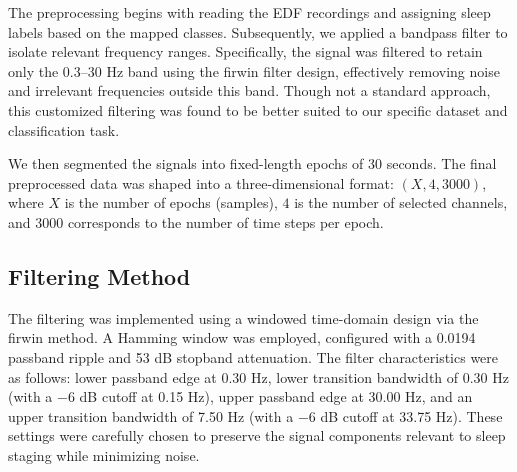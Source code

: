 The preprocessing begins with reading the EDF recordings and assigning sleep labels based on the mapped classes. Subsequently, we applied a bandpass filter to isolate relevant frequency ranges. Specifically, the signal was filtered to retain only the 0.3–30 Hz band using the firwin filter design, effectively removing noise and irrelevant frequencies outside this band. Though not a standard approach, this customized filtering was found to be better suited to our specific dataset and classification task.

We then segmented the signals into fixed-length epochs of 30 seconds. The final preprocessed data was shaped into a three-dimensional format: $(X, 4, 3000)$, where $X$ is the number of epochs (samples), $4$ is the number of selected channels, and $3000$ corresponds to the number of time steps per epoch.

\subsection{Filtering Method}

The filtering was implemented using a windowed time-domain design via the firwin method. A Hamming window was employed, configured with a 0.0194 passband ripple and 53 dB stopband attenuation. The filter characteristics were as follows: lower passband edge at 0.30 Hz, lower transition bandwidth of 0.30 Hz (with a $-6$ dB cutoff at 0.15 Hz), upper passband edge at 30.00 Hz, and an upper transition bandwidth of 7.50 Hz (with a $-6$ dB cutoff at 33.75 Hz). These settings were carefully chosen to preserve the signal components relevant to sleep staging while minimizing noise.








